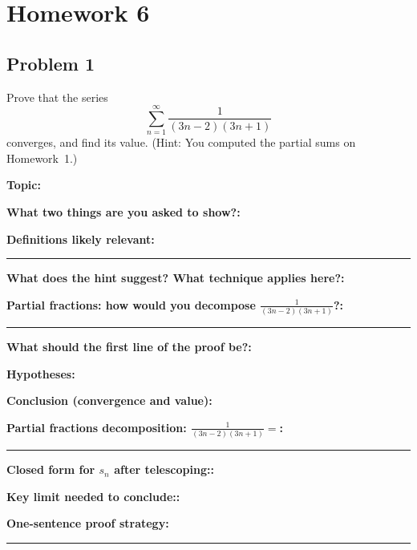\documentclass[12pt]{article}
\newcommand{\fillfield}[1]{%
  \par\noindent\textbf{#1:}\enspace\hrulefill\par\vspace{3pt}%
}
\newcommand{\fillfieldlong}[1]{%
  \par\noindent\textbf{#1:}\par\vspace{1.5cm}%
  \noindent\rule{\linewidth}{0.35pt}\par\vspace{4pt}%
}
\begin{document}
\newpage
\section{Homework 6}

\newpage
\subsection{Problem 1}

\begin{tcolorbox}[
  enhanced, breakable,
  colback  = probblue,
  colframe = blue!55!black,
  fonttitle = \bfseries,
  title = {\textsc{Problem Statement}\hfill Homework 6, Problem 1}
]
Prove that the series
\[
  \sum_{n=1}^{\infty} \frac{1}{(3n-2)(3n+1)}
\]
converges, and find its value.
(Hint: You computed the partial sums on Homework~1.)
\end{tcolorbox}

\bigskip

\begin{tcolorbox}[
  enhanced, breakable,
  colback  = pass1green,
  colframe = green!55!black,
  fonttitle = \bfseries,
  title = {Pass 1 \enspace\textbf{--}\enspace First Diagnosis}
]
\fillfield{Topic}
\fillfield{What two things are you asked to show?}
\fillfieldlong{Definitions likely relevant}
\fillfield{What does the hint suggest? What technique applies here?}
\fillfieldlong{Partial fractions: how would you decompose $\frac{1}{(3n-2)(3n+1)}$?}
\fillfield{What should the first line of the proof be?}
\end{tcolorbox}

\bigskip

\begin{tcolorbox}[
  enhanced, breakable,
  colback  = pass2yellow,
  colframe = yellow!65!black,
  fonttitle = \bfseries,
  title = {Pass 2 \enspace\textbf{--}\enspace Proof Recipe Card}
]
\fillfield{Hypotheses}
\fillfield{Conclusion (convergence and value)}
\fillfieldlong{Partial fractions decomposition: $\frac{1}{(3n-2)(3n+1)} =$}
\fillfield{Closed form for $s_n$ after telescoping:}
\fillfield{Key limit needed to conclude:}
\fillfieldlong{One-sentence proof strategy}
\end{tcolorbox}
\end{document}
